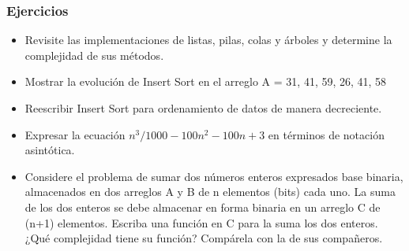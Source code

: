 \documentclass{beamer}
\begin{document}
\begin{frame}[fragile]
 \frametitle{Ejercicios}
\small
\begin{itemize}
\item Revisite las implementaciones de listas, pilas, colas y árboles y determine la complejidad de sus métodos.
\item Mostrar la evolución de Insert Sort en el arreglo A = {31, 41, 59, 26, 41, 58}
\item Reescribir Insert Sort para ordenamiento de datos de manera decreciente.
\item Expresar la ecuación $n^3/1000 - 100n^2 - 100n + 3$ en términos de notación asintótica.
\item Considere el problema de sumar dos números enteros expresados base binaria, almacenados en dos arreglos A y B de n elementos (bits) cada uno. La suma de los dos enteros se debe almacenar en forma binaria en un arreglo C de (n+1) elementos. Escriba una función en C para la suma los dos enteros. ¿Qué complejidad tiene su función? Compárela con la de sus compañeros.
\end{itemize}


\end{frame}
\end{document}

